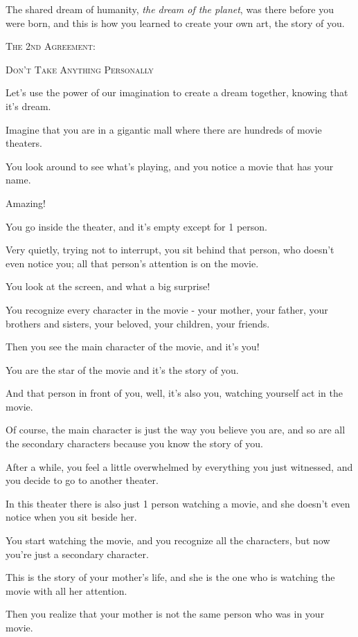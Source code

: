 \documentclass{article}
\numberwithin{equation}{section}
\begin{document}
The shared dream of humanity, \textit{the dream of the planet}, was there before you were born, and this is how you learned to create your own art, the story of you.
\begin{center}
    \textsc{The 2nd Agreement}:
    
    \textsc{Don't Take Anything Personally}
\end{center}

Let's use the power of our imagination to create a dream together, knowing that it's dream.

Imagine that you are in a gigantic mall where there are hundreds of movie theaters.

You look around to see what's playing, and you notice a movie that has your name.

Amazing!

You go inside the theater, and it's empty except for 1 person.

Very quietly, trying not to interrupt, you sit behind that person, who doesn't even notice you; all that person's attention is on the movie.

You look at the screen, and what a big surprise!

You recognize every character in the movie - your mother, your father, your brothers and sisters, your beloved, your children, your friends.

Then you see the main character of the movie, and it's you!

You are the star of the movie and it's the story of you.

And that person in front of you, well, it's also you, watching yourself act in the movie.

Of course, the main character is just the way you believe you are, and so are all the secondary characters because you know the story of you.

After a while, you feel a little overwhelmed by everything you just witnessed, and you decide to go to another theater.

In this theater there is also just 1 person watching a movie, and she doesn't even notice when you sit beside her.

You start watching the movie, and you recognize all the characters, but now you're just a secondary character.

This is the story of your mother's life, and she is the one who is watching the movie with all her attention.

Then you realize that your mother is not the same person who was in your movie.
\end{document}
